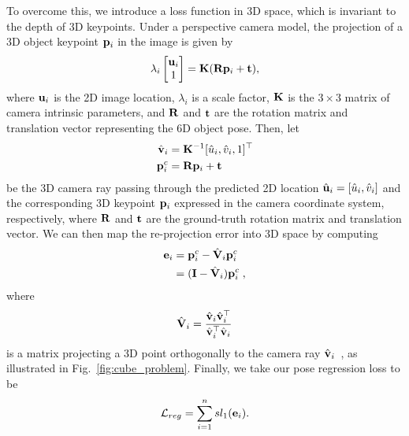 To overcome this, we introduce a loss function in 3D space, which is invariant to the depth of 3D keypoints. Under a perspective camera model, the projection of a 3D object keypoint ${\bf p}_i$ in the image is given by
%
\begin{equation}
    \begin{aligned}
    \lambda_i
    \begin{bmatrix}
    {\bf u}_i \\
    1 \\
    \end{bmatrix}
    =\mathbf{K}(\mathbf{R}{\bf p}_i+{\bf t}),
    \end{aligned}
    \label{eq:perspective}
\end{equation}
%
where ${\bf u}_i$ is the 2D image location, $\lambda_i$ is a scale factor, $\mathbf{K}$ is the $3\times 3$ matrix of camera intrinsic parameters, and $\mathbf{R}$ and ${\bf t}$ are the rotation matrix and translation vector representing the 6D object pose. Then, let
%
\begin{align}
    \hat{{\bf v}}_i & = {\bf K}^{-1}[\hat{u}_i,\hat{v}_i,1]^\top \\
    {\bf p}_i^c      & = {\bf R}{\bf p}_i+{\bf t}
\end{align}
%
be the 3D camera ray passing through the predicted 2D location $\hat{{\bf u}}_i = [\hat{u}_i, \hat{v}_i]$ and the corresponding 3D keypoint ${\bf p}_i$ expressed in the camera coordinate system, respectively, where ${\bf R}$ and ${\bf t}$ are the ground-truth rotation matrix and translation vector.  We can then map the re-projection error into 3D space by computing
%
\begin{equation}
    \begin{split}
    {\bf e}_i   & = {\bf p}_i^c - \hat{{\bf V}}_i {\bf p}_i^c \\
                & = ({\bf I}-\hat{{\bf V}}_i) {\bf p}_i^c\;,
    \end{split}
\end{equation}
%
where 
%
\begin{equation}
    \hat{{\bf V}}_i = \frac{\hat{{\bf v}}_i\hat{{\bf v}}_i^\top}{\hat{{\bf v}}_i^\top\hat{{\bf v}}_i}
\end{equation}
is a matrix projecting a 3D point orthogonally to the camera ray $\hat{{\bf v}}_i$~\cite{Lu00}, as illustrated in Fig.~\ref{fig:cube_problem}.
Finally, we take our pose regression loss to be
\begin{equation}
   {\cal L}_{reg} = \sum_{i=1}^{n}{sl_1({\bf e}_i)}.
\end{equation}
